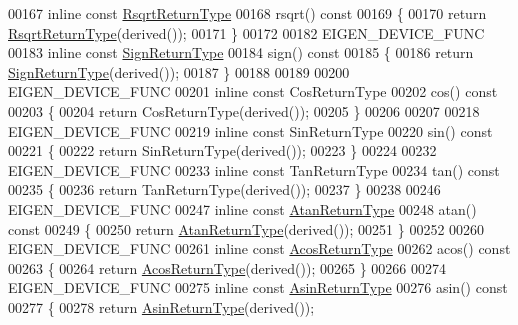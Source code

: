 \begin{DoxyCode}
00167 \textcolor{keyword}{inline} \textcolor{keyword}{const} \hyperlink{group___core___module_class_eigen_1_1_cwise_unary_op}{RsqrtReturnType}
00168 rsqrt()\textcolor{keyword}{ const}
00169 \textcolor{keyword}{}\{
00170   \textcolor{keywordflow}{return} \hyperlink{group___core___module_class_eigen_1_1_cwise_unary_op}{RsqrtReturnType}(derived());
00171 \}
00172 
00182 EIGEN\_DEVICE\_FUNC
00183 \textcolor{keyword}{inline} \textcolor{keyword}{const} \hyperlink{group___core___module_class_eigen_1_1_cwise_unary_op}{SignReturnType}
00184 sign()\textcolor{keyword}{ const}
00185 \textcolor{keyword}{}\{
00186   \textcolor{keywordflow}{return} \hyperlink{group___core___module_class_eigen_1_1_cwise_unary_op}{SignReturnType}(derived());
00187 \}
00188 
00189 
00200 EIGEN\_DEVICE\_FUNC
00201 \textcolor{keyword}{inline} \textcolor{keyword}{const} CosReturnType
00202 cos()\textcolor{keyword}{ const}
00203 \textcolor{keyword}{}\{
00204   \textcolor{keywordflow}{return} CosReturnType(derived());
00205 \}
00206 
00207 
00218 EIGEN\_DEVICE\_FUNC
00219 \textcolor{keyword}{inline} \textcolor{keyword}{const} SinReturnType
00220 sin()\textcolor{keyword}{ const}
00221 \textcolor{keyword}{}\{
00222   \textcolor{keywordflow}{return} SinReturnType(derived());
00223 \}
00224 
00232 EIGEN\_DEVICE\_FUNC
00233 \textcolor{keyword}{inline} \textcolor{keyword}{const} TanReturnType
00234 tan()\textcolor{keyword}{ const}
00235 \textcolor{keyword}{}\{
00236   \textcolor{keywordflow}{return} TanReturnType(derived());
00237 \}
00238 
00246 EIGEN\_DEVICE\_FUNC
00247 \textcolor{keyword}{inline} \textcolor{keyword}{const} \hyperlink{group___core___module_class_eigen_1_1_cwise_unary_op}{AtanReturnType}
00248 atan()\textcolor{keyword}{ const}
00249 \textcolor{keyword}{}\{
00250   \textcolor{keywordflow}{return} \hyperlink{group___core___module_class_eigen_1_1_cwise_unary_op}{AtanReturnType}(derived());
00251 \}
00252 
00260 EIGEN\_DEVICE\_FUNC
00261 \textcolor{keyword}{inline} \textcolor{keyword}{const} \hyperlink{group___core___module_class_eigen_1_1_cwise_unary_op}{AcosReturnType}
00262 acos()\textcolor{keyword}{ const}
00263 \textcolor{keyword}{}\{
00264   \textcolor{keywordflow}{return} \hyperlink{group___core___module_class_eigen_1_1_cwise_unary_op}{AcosReturnType}(derived());
00265 \}
00266 
00274 EIGEN\_DEVICE\_FUNC
00275 \textcolor{keyword}{inline} \textcolor{keyword}{const} \hyperlink{group___core___module_class_eigen_1_1_cwise_unary_op}{AsinReturnType}
00276 asin()\textcolor{keyword}{ const}
00277 \textcolor{keyword}{}\{
00278   \textcolor{keywordflow}{return} \hyperlink{group___core___module_class_eigen_1_1_cwise_unary_op}{AsinReturnType}(derived());

\end{DoxyCode}
